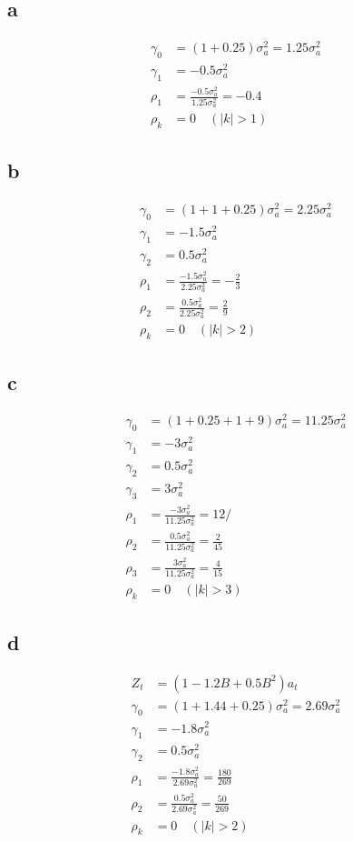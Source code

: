 \documentclass{article}
\begin{document}
\subsection*{a}
\[
\begin{aligned}
\gamma_0 &= (1 + 0.25)\sigma_a^2 = 1.25\sigma_a^2 \\
\gamma_1 &= -0.5\sigma_a^2 \\
\rho_1 &=  \frac{-0.5\sigma_a^2}{1.25\sigma_a^2} = -0.4 \\
\rho_k &= 0 \quad (\lvert k \rvert > 1)
\end{aligned}
\]

\subsection*{b}
\[
\begin{aligned}
\gamma_0 &= (1 + 1 + 0.25)\sigma_a^2 = 2.25\sigma_a^2 \\
\gamma_1 &= -1.5\sigma_a^2 \\
\gamma_2 &= 0.5\sigma_a^2 \\
\rho_1  &= \frac{-1.5\sigma_a^2}{2.25\sigma_a^2} = -\frac{2}{3} \\
\rho_2 &=  \frac{0.5\sigma_a^2}{2.25\sigma_a^2} = \frac{2}{9} \\
\rho_k &= 0 \quad (\lvert k \rvert > 2)
\end{aligned}
\]

\subsection*{c}
\[
\begin{aligned}
\gamma_0 &= (1 + 0.25 + 1 + 9)\sigma_a^2 = 11.25\sigma_a^2 \\
\gamma_1 &= -3\sigma_a^2 \\
\gamma_2 &= 0.5\sigma_a^2 \\
\gamma_3 &= 3\sigma_a^2 \\
\rho_1 &=  \frac{-3\sigma_a^2}{11.25\sigma_a^2} = 12/ \\
\rho_2 &=  \frac{0.5\sigma_a^2}{11.25\sigma_a^2} =\frac{2}{45} \\
\rho_3 &=  \frac{3\sigma_a^2}{11.25\sigma_a^2} = \frac{4}{15} \\
\rho_k &= 0 \quad (\lvert k \rvert > 3)
\end{aligned}
\]

\subsection*{d}
\[
\begin{aligned}
Z_t &= (1 - 1.2B + 0.5B^2)a_t \\
\gamma_0 &= (1 + 1.44 + 0.25)\sigma_a^2 = 2.69\sigma_a^2 \\
\gamma_1 &= -1.8\sigma_a^2 \\
\gamma_2 &= 0.5\sigma_a^2 \\
\rho_1 &=  \frac{-1.8\sigma_a^2}{2.69\sigma_a^2} =\frac{180}{269}  \\
\rho_2 &=  \frac{0.5\sigma_a^2}{2.69\sigma_a^2} =\frac{50}{269}  \\
\rho_k &= 0 \quad (\lvert k \rvert > 2)
\end{aligned}
\]
\end{document}
